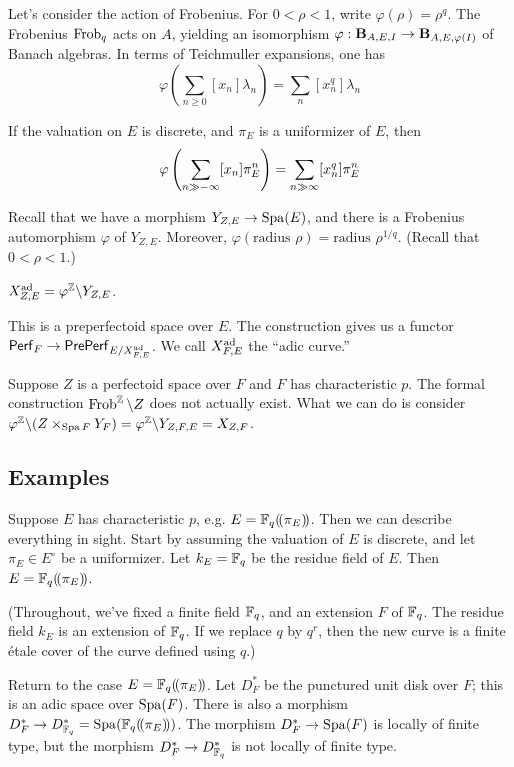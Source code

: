 Let's consider the action of Frobenius. For $0<\rho<1$, write 
$\varphi(\rho) = \rho^q$. The Frobenius $\operatorname{Frob}_q$ acts on $A$, yielding an 
isomorphism $\varphi:\mathbf{B}_{A,E,I} \to \mathbf{B}_{A,E,\varphi(I)}$ of Banach algebras. In 
terms of Teichmuller expansions, one has 
\[
  \varphi\left(\sum_{n\geqslant 0} [x_n] \lambda_n\right) = \sum_n [x_n^q] \lambda_n
\]

\begin{theorem}
If the valuation on $E$ is discrete, and $\pi_E$ is a uniformizer of $E$, then 
\[
  \varphi\left(\sum_{n\gg -\infty} [x_n] \pi_E^n\right) = \sum_{n\gg\-\infty} [x_n^q] \pi_E^n
\]
\end{theorem}

Recall that we have a morphism $Y_{Z,E} \to \operatorname{Spa}(E)$, and there is a Frobenius 
automorphism $\varphi$ of $Y_{Z,E}$. Moreover, 
$\varphi(\text{radius $\rho$})=\text{radius }\rho^{1/q}$. (Recall that 
$0<\rho<1$.) 

\begin{definition}
$X_{Z,E}^{\textnormal{ad}} = \varphi^{\mathbb{Z}} \backslash Y_{Z,E}$. 
\end{definition}
This is a preperfectoid space over $E$. The construction gives us a functor 
$\mathsf{Perf}_F \to \mathsf{PrePerf}_{E/X_{F,E}^{\textnormal{ad}}}$. We call 
$X_{F,E}^{\textnormal{ad}}$ the ``adic curve.'' 

Suppose $Z$ is a perfectoid space over $F$ and $F$ has characteristic $p$. 
The formal construction 
$\operatorname{Frob}^{\mathbb{Z}}\backslash Z$ does not actually exist. What we can do is consider 
$\varphi^{\mathbb{Z}}\backslash (Z\times_{\operatorname{Spa} F} Y_F) = \varphi^{\mathbb{Z}}\backslash Y_{Z,F,E} = X_{Z,F}$. 





\subsection{Examples}

Suppose $E$ has characteristic $p$, e.g. $E=\mathbb{F}_q(\!( {\pi_E} )\!)$. Then we can 
describe everything in sight. Start by assuming the valuation of $E$ is discrete, 
and let $\pi_E\in E^\circ$ be a uniformizer. Let $k_E=\mathbb{F}_q$ be the residue 
field of $E$. Then $E=\mathbb{F}_q(\!( {\pi_E} )\!)$. 

(Throughout, we've fixed a finite field $\mathbb{F}_q$, and an extension $F$ of $\mathbb{F}_q$. The 
residue field $k_E$ is an extension of $\mathbb{F}_q$. If we replace $q$ by $q^r$, then the 
new curve is a finite \'etale cover of the curve defined using $q$.)

Return to the case $E=\mathbb{F}_q(\!( {\pi_E} )\!)$. Let $D_F^\ast$ be the punctured unit 
disk over $F$; this is an adic space over $\operatorname{Spa}(F)$. There is also a morphism 
$D_F^\ast \to D_{\mathbb{F}_q}^\ast = \operatorname{Spa}(\mathbb{F}_q(\!( {\pi_E} )\!))$. The morphism 
$D_F^\ast \to \operatorname{Spa}(F)$ is locally of finite type, but the morphism 
$D_F^\ast \to D_{\mathbb{F}_q}^\ast$ is not locally of finite type. 

